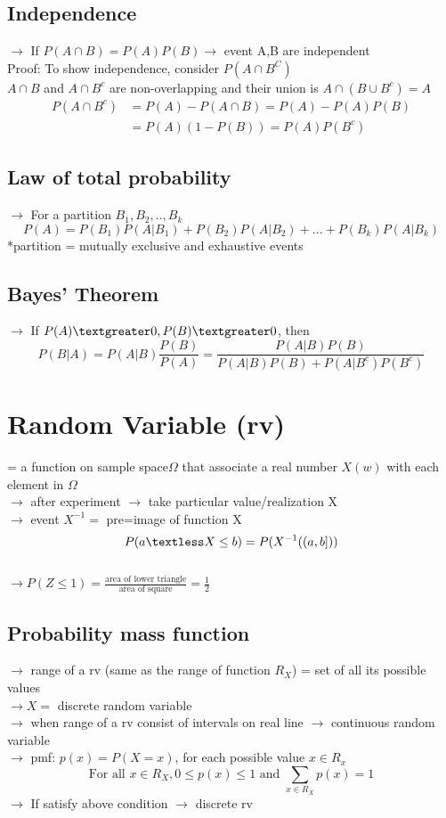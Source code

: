 \documentclass{article}
\begin{document}
\subsection{Independence}
$\rightarrow$ If $P(A \cap B) = P(A)P(B) \rightarrow$ event A,B are independent \\
Proof: To show independence, consider $P(A \cap B^C)$\\
$A \cap B $ and $A \cap B^c $ are non-overlapping and their union is $A \cap (B \cup B^c) =A$ 
\begin{align*}
P(A \cap B^c) &= P(A) - P(A \cap B) = P(A) - P(A)P(B) \\
&= P(A)(1 - P(B)) = P(A)P(B^c)
\end{align*}
\subsection{Law of total probability}
$\rightarrow$ For a partition $B_1, B_2,..,B_k$
\[P(A) = P(B_1)P(A|B_1) +P(B_2)P(A|B_2) + ... +P(B_k)P(A|B_k)\]
*partition = mutually exclusive and exhaustive events \\
\subsection{Bayes' Theorem}
$\rightarrow$ If $P(A) \textgreater 0, P(B) \textgreater 0$, then
\[P(B|A) = P(A|B)\frac{P(B)}{P(A)} = \frac{P(A|B)P(B)}{P(A|B)P(B)+ P(A|B^c)P(B^c)}\]
\newpage
\section{Random Variable (rv)}
= a function on sample space$\Omega$ that associate a real number $X(w)$ with each element in $\Omega$\\
$\rightarrow$ after experiment $\rightarrow$ take particular value/realization X \\
$\rightarrow$ event $X^{-1} = $ pre=image of function X \\
\[P(a \textless X \leq b) = P(X^{-1}((a,b]))\]\\
$\rightarrow P(Z \leq 1) = \frac{\text{area of lower triangle}}{\text{area of square}} = \frac{1}{2}$\\
\subsection{Probability mass function}
$\rightarrow$ range of a rv (same as the range of function $R_X$) = set of all its possible values \\
$\rightarrow X = $ discrete random variable\\
$\rightarrow$ when range of a rv consist of intervals on real line $\rightarrow$ continuous random variable \\
$\rightarrow$ pmf: $p(x) = P(X =x)$, for each possible value $x\in R_x$\\
\[\text{For all }x\in R_X , 0 \leq p(x) \leq 1 \text{ and } \sum_{x\in R_X} p(x) =1\] 
$\rightarrow$ If satisfy above condition $\rightarrow$ discrete rv \\
\end{document}
